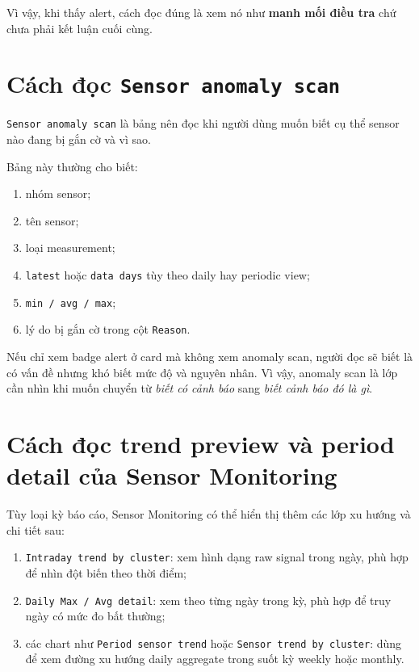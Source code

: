 Vì vậy, khi thấy alert, cách đọc đúng là xem nó như \textbf{manh mối điều tra} chứ chưa phải kết luận cuối cùng.

\section{Cách đọc \texttt{Sensor anomaly scan}}

\texttt{Sensor anomaly scan} là bảng nên đọc khi người dùng muốn biết cụ thể sensor nào đang bị gắn cờ và vì sao.

Bảng này thường cho biết:

\begin{enumerate}[label=-]
\item nhóm sensor;
\item tên sensor;
\item loại measurement;
\item \texttt{latest} hoặc \texttt{data days} tùy theo daily hay periodic view;
\item \texttt{min / avg / max};
\item lý do bị gắn cờ trong cột \texttt{Reason}.
\end{enumerate}

Nếu chỉ xem badge alert ở card mà không xem anomaly scan, người đọc sẽ biết là có vấn đề nhưng khó biết mức độ và nguyên nhân. Vì vậy, anomaly scan là lớp cần nhìn khi muốn chuyển từ \textit{biết có cảnh báo} sang \textit{biết cảnh báo đó là gì}.

\section{Cách đọc trend preview và period detail của Sensor Monitoring}

Tùy loại kỳ báo cáo, Sensor Monitoring có thể hiển thị thêm các lớp xu hướng và chi tiết sau:

\begin{enumerate}[label=-]
\item \texttt{Intraday trend by cluster}: xem hình dạng raw signal trong ngày, phù hợp để nhìn đột biến theo thời điểm;
\item \texttt{Daily Max / Avg detail}: xem theo từng ngày trong kỳ, phù hợp để truy ngày có mức đo bất thường;
\item các chart như \texttt{Period sensor trend} hoặc \texttt{Sensor trend by cluster}: dùng để xem đường xu hướng daily aggregate trong suốt kỳ weekly hoặc monthly.
\end{enumerate}

